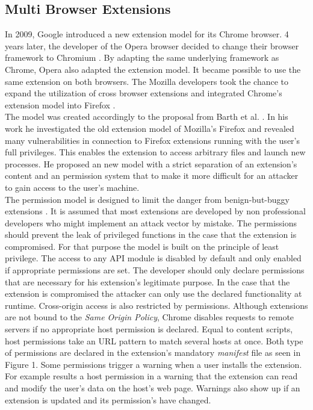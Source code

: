 \subsection{Multi Browser Extensions}
	
	In 2009, Google introduced a new extension model for its Chrome browser. 4 years later, the developer of the Opera browser decided to change their browser framework to Chromium \cite{operaBlogSwitchToChromium}. By adapting the same underlying framework as Chrome, Opera also adapted the extension model. It became possible to use the same extension on both browsers. The Mozilla developers took the chance to expand the utilization of cross browser extensions and integrated Chrome's extension model into Firefox \cite{mozillaBlogWebExtension}. \\
	The model was created accordingly to the proposal from Barth et al. \cite{Barth10protectingbrowsers}. In his work he investigated the old extension model of Mozilla's Firefox and revealed many vulnerabilities in connection to Firefox extensions running with the user's full privileges. This enables the extension to access arbitrary files and launch new processes. He proposed an new model with a strict separation of an extension's content and an permission system that to make it more difficult for an attacker to gain access to the user's machine. \\ 	
	The permission model is designed to limit the danger from benign-but-buggy extensions \cite{Barth10protectingbrowsers}. It is assumed that most extensions are developed by non professional developers who might implement an attack vector by mistake. The permissions should prevent the leak of privileged functions in the case that the extension is compromised. For that purpose the model is built on the principle of least privilege. The access to any API module is disabled by default and only enabled if appropriate permissions are set. The developer should only declare permissions that are necessary for his extension's legitimate purpose. In the case that the extension is compromised the attacker can only use the declared functionality at runtime. Cross-origin access is also restricted by permissions. Although extensions are not bound to the \textit{Same Origin Policy}, Chrome disables requests to remote servers if no appropriate host permission is declared. Equal to content scripts, host permissions take an URL pattern to match several hosts at once. Both type of permissions are declared in the extension's mandatory \textit{manifest} file as seen in Figure 1. Some permissions trigger a warning when a user installs the extension. For example results a host permission in a warning that the extension can read and modify the user's data on the host's web page. Warnings also show up if an extension is updated and its permission's have changed. \\
	
